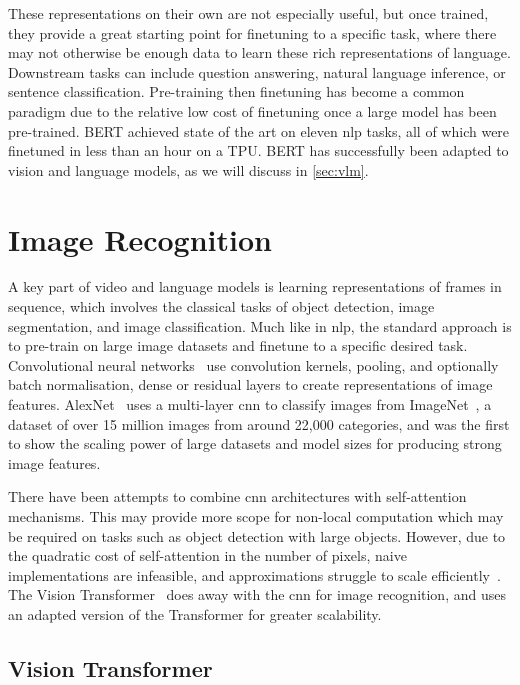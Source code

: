 These representations on their own are not especially useful, but once trained,
they provide a great starting point for finetuning to a specific task, where
there may not otherwise be enough data to learn these rich representations of
language. Downstream tasks can include question answering, natural language
inference, or sentence classification. Pre-training then finetuning has become
a common paradigm due to the relative low cost of finetuning once a large model
has been pre-trained. BERT achieved state of the art on eleven \acrshort{nlp}
tasks, all of which were finetuned in less than an hour on a TPU. BERT has
successfully been adapted to vision and language models, as we will discuss in
\cref{sec:vlm}.


\section{Image Recognition}
\label{sec:imrec}

A key part of video and language models is learning representations of frames
in sequence, which involves the classical tasks of object detection, image
segmentation, and image classification. Much like in \acrshort{nlp}, the
standard approach is to pre-train on large image datasets and finetune to a
specific desired task. Convolutional neural
networks~\citep{lecun1989lenet,krizhevsky2012alexnet,he2016resnet} use
convolution kernels, pooling, and optionally batch normalisation, dense or
residual layers to create representations of image features.
AlexNet~\citep{krizhevsky2012alexnet} uses a multi-layer \acrfull{cnn} to
classify images from ImageNet~\citep{deng2009imagenet}, a dataset of over 15
million images from around 22,000 categories, and was the first to show the
scaling power of large datasets and model sizes for producing strong image
features. 

There have been attempts to combine \acrshort{cnn} architectures with
self-attention mechanisms. This may provide more scope for non-local
computation which may be required on tasks such as object detection with large
objects. However, due to the quadratic cost of self-attention in the number of
pixels, naive implementations are infeasible, and approximations struggle to
scale efficiently~\citep{carion2020detr}. The Vision
Transformer~\citep{dosovitskiy2021vit} does away with the \acrshort{cnn} for
image recognition, and uses an adapted version of the Transformer for greater
scalability.


\subsection{Vision Transformer}
\label{ssec:vit}

